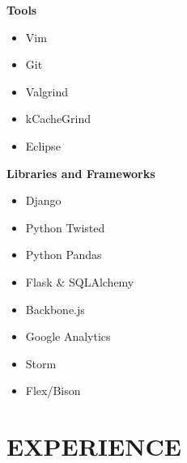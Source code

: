 \documentclass[overlapped]{res}
\begin{document}
\begin{resume}
\begin{multicols}{3}
        \textbf{Tools}
        \begin{itemize}
            \item Vim
            \item Git
            \item Valgrind
            \item kCacheGrind
            \item Eclipse
        \end{itemize}
        \columnbreak

        \textbf{Libraries and Frameworks}
        \begin{itemize}
            \item Django
            \item Python Twisted
            \item Python Pandas
            \item Flask \& SQLAlchemy
            \item Backbone.js
            \item Google Analytics
            \item Storm
            \item Flex/Bison
        \end{itemize}
    \end{multicols}

\section{EXPERIENCE}
\vspace{0.125in}


\end{resume}
\end{document}

